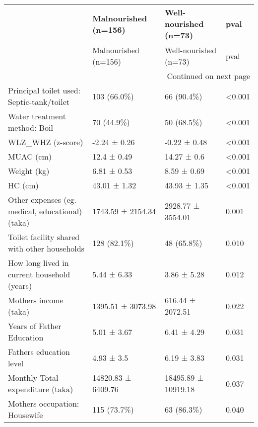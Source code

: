 \begin{longtable}{llll}
\toprule
{} & Malnourished (n=156) & Well-nourished (n=73) &    pval \\
\midrule
\endfirsthead

\toprule
{} & Malnourished (n=156) & Well-nourished (n=73) &    pval \\
\midrule
\endhead
\midrule
\multicolumn{4}{r}{{Continued on next page}} \\
\midrule
\endfoot

\bottomrule
\endlastfoot
Principal toilet used: Septic-tank/toilet       &          103 (66.0\%) &            66 (90.4\%) &  <0.001 \\
Water treatment method: Boil                    &           70 (44.9\%) &            50 (68.5\%) &  <0.001 \\
WLZ\_WHZ (z-score)                               &         -2.24 ± 0.26 &          -0.22 ± 0.48 &  <0.001 \\
MUAC (cm)                                       &          12.4 ± 0.49 &           14.27 ± 0.6 &  <0.001 \\
Weight (kg)                                     &          6.81 ± 0.53 &           8.59 ± 0.69 &  <0.001 \\
HC (cm)                                         &         43.01 ± 1.32 &          43.93 ± 1.35 &  <0.001 \\
Other expenses (eg. medical, educational)(taka) &    1743.59 ± 2154.34 &     2928.77 ± 3554.01 &   0.001 \\
Toilet facility shared with other households    &          128 (82.1\%) &            48 (65.8\%) &   0.010 \\
How long lived in current household (years)     &          5.44 ± 6.33 &           3.86 ± 5.28 &   0.012 \\
Mothers income (taka)                           &    1395.51 ± 3073.98 &      616.44 ± 2072.51 &   0.022 \\
Years of Father Education                       &          5.01 ± 3.67 &           6.41 ± 4.29 &   0.031 \\
Fathers education level                         &           4.93 ± 3.5 &           6.19 ± 3.83 &   0.031 \\
Monthly Total expenditure (taka)                &   14820.83 ± 6409.76 &   18495.89 ± 10919.18 &   0.037 \\
Mothers occupation: Housewife                   &          115 (73.7\%) &            63 (86.3\%) &   0.040 \\

\end{longtable}
